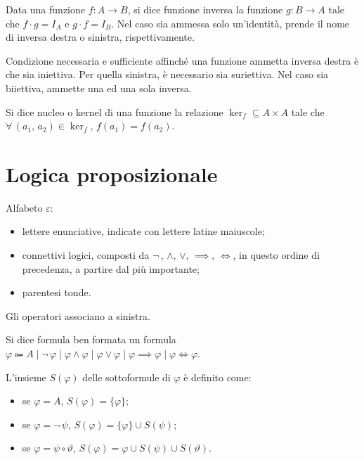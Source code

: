 \documentclass[10pt]{article}
\begin{document}
                Data una funzione \(f : A \to B\), si dice funzione inversa la funzione \(g : B \to A\) tale che
                \(f \cdot g = I_A\) e \(g \cdot f = I_B\). Nel caso sia ammessa solo un'identità, prende il nome di inversa destra
                o sinistra, rispettivamente.

                Condizione necessaria e sufficiente affinché una funzione ammetta inversa destra è che sia iniettiva. Per quella
                sinistra, è necessario sia suriettiva. Nel caso sia biiettiva, ammette una ed una sola inversa.

                Si dice nucleo o kernel di una funzione la relazione \(\ker_f \subseteq A \times A\) tale che
                \(\forall \, (a_1, \, a_2) \in \ker_f, \, f(a_1) = f(a_2)\).

    \section*{Logica proposizionale}

        Alfabeto \(\varepsilon\):
        \begin{itemize}
            \item lettere enunciative, indicate con lettere latine maiuscole;
            \item connettivi logici, composti da \(\neg \,, \, \land, \, \lor, \, \implies, \, \iff\), in questo ordine di precedenza,
                a partire dal più importante;
            \item parentesi tonde.
        \end{itemize}
        Gli operatori associano a sinistra.

        Si dice formula ben formata un formula \(\varphi \Coloneqq A \; | \; \neg \, \varphi \; | \; \varphi \land \varphi \; | \; \varphi \lor \varphi \; | \; \varphi \implies \varphi \; | \; \varphi \iff \varphi\).

        L'insieme \(S(\varphi)\) delle sottoformule di \(\varphi\) è definito come:
        \begin{itemize}
            \item se \(\varphi = A\), \(S(\varphi) = \{\varphi\}\);
            \item se \(\varphi = \neg \, \psi\), \(S(\varphi) = \{\varphi\} \cup S(\psi)\);
            \item se \(\varphi = \psi \circ \vartheta\), \(S(\varphi) = {\varphi} \cup S(\psi) \cup S(\vartheta)\).
        \end{itemize}
\end{document}
